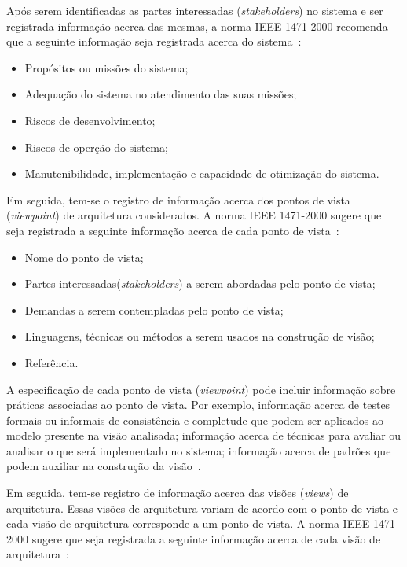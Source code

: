 Após serem identificadas as partes interessadas (\emph{stakeholders}) no sistema e ser registrada informação acerca das mesmas, a norma IEEE 1471-2000  recomenda que a seguinte informação seja registrada acerca do sistema~\cite{ISO_1471}:

\begin{itemize}
    \item Propósitos ou missões do sistema;
    \item Adequação do sistema no atendimento das suas missões;
    \item Riscos de desenvolvimento;
    \item Riscos de operção do sistema;
    \item Manutenibilidade, implementação e capacidade de otimização do sistema.
\end{itemize}

Em seguida, tem-se o registro de informação acerca dos pontos de vista (\emph{viewpoint}) de arquitetura considerados. A norma IEEE 1471-2000 sugere que seja registrada a seguinte informação acerca de cada ponto de vista~\cite{ISO_1471}:

\begin{itemize}
    \item Nome do ponto de vista;
    \item Partes interessadas(\emph{stakeholders}) a serem abordadas pelo ponto de vista;
    \item Demandas a serem contempladas pelo ponto de vista;
    \item Linguagens, técnicas ou métodos a serem usados na construção de visão;
    \item Referência.
\end{itemize}

A especificação de cada ponto de vista (\emph{viewpoint}) pode incluir informação sobre  práticas associadas ao ponto de vista. Por exemplo, informação acerca de testes formais ou informais de consistência e completude que podem ser aplicados ao modelo presente na visão analisada; informação acerca de técnicas para avaliar ou analisar o que será implementado no sistema; informação acerca de padrões que podem auxiliar na construção da visão~\cite{ISO_1471}. 

Em seguida, tem-se registro de informação acerca das visões (\emph{views}) de arquitetura. Essas visões de arquitetura variam de acordo com o ponto de vista e cada visão de arquitetura corresponde a um ponto de vista. A norma IEEE 1471-2000 sugere que seja registrada a seguinte informação acerca de cada visão de arquitetura~\cite{ISO_1471}:

